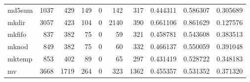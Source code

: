 \begin{longtable}{lrrrrrrrrr}
md5sum    &                                               1037 &                                                429 &                                                149 &                                                  0 &                                                142 &                                                317 &                                           0.444311 &                               0.586307 &                             0.305689 \\
mkdir     &                                               3057 &                                                423 &                                                104 &                                                  0 &                                               2140 &                                                390 &                                           0.661106 &                               0.861629 &                             0.127576 \\
mkfifo    &                                                837 &                                                382 &                                                 75 &                                                  0 &                                                 59 &                                                321 &                                           0.458781 &                               0.543608 &                             0.383513 \\
mknod     &                                                849 &                                                382 &                                                 75 &                                                  0 &                                                 60 &                                                332 &                                           0.466137 &                               0.550059 &                             0.391048 \\
mktemp    &                                                853 &                                                402 &                                                 89 &                                                  0 &                                                 65 &                                                297 &                                           0.431419 &                               0.528722 &                             0.348183 \\
mv        &                                               3668 &                                               1719 &                                                264 &                                                  0 &                                                323 &                                               1362 &                                           0.455357 &                               0.531352 &                             0.371320 \\

\end{longtable}
